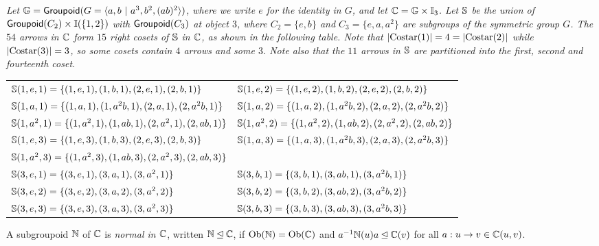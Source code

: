 \newpage
\begin{example}
\emph{Let $\mathbb{G} = {\sf Groupoid}(G = \langle a,b ~|~a^3,b^2,(ab)^2 \rangle)$, 
where we write $e$ for the identity in $G$, 
and let $\mathbb{C} = \mathbb{G} \times \mathbb{I}_3$. 
Let $\mathbb{S}$ be the union of ${\sf Groupoid}(C_2) \times \mathbb{I}(\{1,2\})$ 
with ${\sf Groupoid}(C_3)$ at object $3$, where $C_2=\{e,b\}$ and $C_3=\{e,a,a^2\}$ 
are subgroups of the symmetric group $G$. 
The $54$ arrows in $\mathbb{C}$ form $15$ right cosets of $\mathbb{S}$ in $\mathbb{C}$, 
as shown in the following table. 
Note that $|\mathrm{Costar}(1)|=4=|\mathrm{Costar}(2)|$ while $|\mathrm{Costar}(3)|=3$, 
so some cosets contain $4$ arrows and some $3$. 
Note also that the $11$ arrows in $\mathbb{S}$ are partitioned into 
the first, second and fourteenth coset.} 
{\small 
\begin{center} 
\begin{tabular}{ll}
$\mathbb{S}(1,e,1) = \{(1,e,1),(1,b,1),(2,e,1),(2,b,1)\}$ 
  & $\mathbb{S}(1,e,2) = \{(1,e,2),(1,b,2),(2,e,2),(2,b,2)\}$ \\  
$\mathbb{S}(1,a,1) = \{(1,a,1),(1,a^2b,1),(2,a,1),(2,a^2b,1)\}$ 
  & $\mathbb{S}(1,a,2) = \{(1,a,2),(1,a^2b,2),(2,a,2),(2,a^2b,2)\}$ \\  
$\mathbb{S}(1,a^2,1) = \{(1,a^2,1),(1,ab,1),(2,a^2,1),(2,ab,1)\}$ 
  & $\mathbb{S}(1,a^2,2) = \{(1,a^2,2),(1,ab,2),(2,a^2,2),(2,ab,2)\}$ \\  
$\mathbb{S}(1,e,3) = \{(1,e,3),(1,b,3),(2,e,3),(2,b,3)\}$ 
  & $\mathbb{S}(1,a,3) = \{(1,a,3),(1,a^2b,3),(2,a,3),(2,a^2b,3)\}$ \\  
$\mathbb{S}(1,a^2,3) = \{(1,a^2,3),(1,ab,3),(2,a^2,3),(2,ab,3)\}$ 
  &  \\  
$\mathbb{S}(3,e,1) = \{(3,e,1),(3,a,1),(3,a^2,1)\}$ 
  & $\mathbb{S}(3,b,1) = \{(3,b,1),(3,ab,1),(3,a^2b,1)\}$ \\  
$\mathbb{S}(3,e,2) = \{(3,e,2),(3,a,2),(3,a^2,2)\}$ 
  & $\mathbb{S}(3,b,2) = \{(3,b,2),(3,ab,2),(3,a^2b,2)\}$ \\  
$\mathbb{S}(3,e,3) = \{(3,e,3),(3,a,3),(3,a^2,3)\}$ 
  & $\mathbb{S}(3,b,3) = \{(3,b,3),(3,ab,3),(3,a^2b,3)\}$ \\  
\end{tabular}
\end{center}}
\end{example}



A subgroupoid $\mathbb{N}$ of $\mathbb{C}$ is \emph{normal in $\mathbb{C}$}, 
written $\mathbb{N} \unlhd \mathbb{C}$, 
if $\mathrm{Ob}(\mathbb{N}) = \mathrm{Ob}(\mathbb{C})$ and $a^{-1}\mathbb{N}(u)a \unlhd \mathbb{C}(v)$ 
for all $a : u \to v \in \mathbb{C}(u,v)$. 

